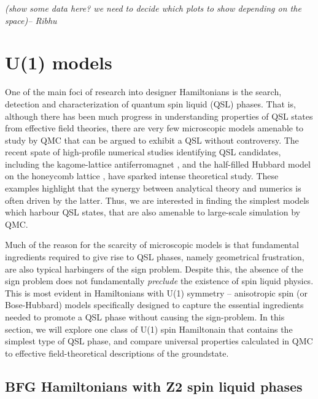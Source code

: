 \documentclass[range]{ar2e}
\begin{document}
{\em (show some data here? we need to decide which plots to show
  depending on the space)-- Ribhu}

\section{U(1) models}
\label{sec:u1models}

One of the main foci of research into designer Hamiltonians is the search, detection and characterization of quantum spin liquid (QSL) phases.  
That is, although there has been much progress in understanding properties of QSL states from effective field theories, there are very few microscopic models amenable to study by QMC that can be argued to exhibit a QSL without controversy.
The recent spate of high-profile numerical studies identifying QSL candidates, including the kagome-lattice antiferromagnet \cite{Yan}, and the half-filled Hubbard model on the honeycomb lattice \cite{Meng}, have sparked intense theoretical study.   
These examples highlight that the synergy between analytical theory and numerics is often driven by the latter.  Thus, we are interested in finding the simplest models which harbour QSL states, that are also amenable to large-scale simulation by QMC.

Much of the reason for the scarcity of microscopic models is that fundamental ingredients required to give rise to QSL phases, namely geometrical frustration, are also typical harbingers of the sign problem.  Despite this, the absence of the sign problem does not fundamentally {\it preclude} the existence of spin liquid physics.  This is most evident in Hamiltonians with U(1) symmetry -- anisotropic spin (or Bose-Hubbard) models specifically designed to capture the essential ingredients needed to promote a QSL phase without causing the sign-problem.  In this section, we will explore one class of U(1) spin Hamiltonain that contains the simplest type of QSL phase, and compare universal properties calculated in QMC to effective field-theoretical descriptions of the groundstate.

\subsection{BFG Hamiltonians with Z2 spin liquid phases}

\end{document}
